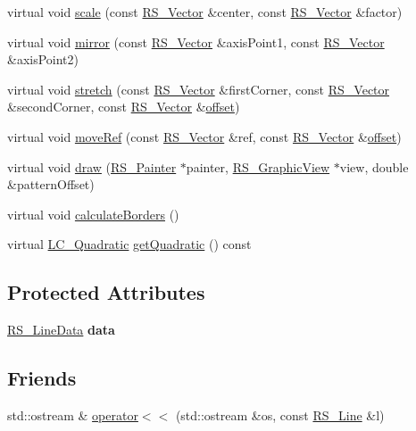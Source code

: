 \begin{DoxyCompactItemize}
\item 
virtual void \hyperlink{classRS__Line_a2fc7cd6bf204c4bc774c1c9f0886aee3}{scale} (const \hyperlink{classRS__Vector}{R\-S\-\_\-\-Vector} \&center, const \hyperlink{classRS__Vector}{R\-S\-\_\-\-Vector} \&factor)
\item 
virtual void \hyperlink{classRS__Line_a81c3d1c89f6ecd8f1e577bdd1b239506}{mirror} (const \hyperlink{classRS__Vector}{R\-S\-\_\-\-Vector} \&axis\-Point1, const \hyperlink{classRS__Vector}{R\-S\-\_\-\-Vector} \&axis\-Point2)
\item 
virtual void \hyperlink{classRS__Line_a2c1e331e16b7264b3e8a34cae9cc52b4}{stretch} (const \hyperlink{classRS__Vector}{R\-S\-\_\-\-Vector} \&first\-Corner, const \hyperlink{classRS__Vector}{R\-S\-\_\-\-Vector} \&second\-Corner, const \hyperlink{classRS__Vector}{R\-S\-\_\-\-Vector} \&\hyperlink{classRS__Line_a159f62094d2f2cbcbe56b38c60e8b96f}{offset})
\item 
virtual void \hyperlink{classRS__Line_adcf436378e89d52b6029409b464ebccb}{move\-Ref} (const \hyperlink{classRS__Vector}{R\-S\-\_\-\-Vector} \&ref, const \hyperlink{classRS__Vector}{R\-S\-\_\-\-Vector} \&\hyperlink{classRS__Line_a159f62094d2f2cbcbe56b38c60e8b96f}{offset})
\item 
virtual void \hyperlink{classRS__Line_abbf35036555e09aa10ac2606aafab1b6}{draw} (\hyperlink{classRS__Painter}{R\-S\-\_\-\-Painter} $\ast$painter, \hyperlink{classRS__GraphicView}{R\-S\-\_\-\-Graphic\-View} $\ast$view, double \&pattern\-Offset)
\item 
virtual void \hyperlink{classRS__Line_afdec6ba966dee60b72e473b93086ae68}{calculate\-Borders} ()
\item 
virtual \hyperlink{classLC__Quadratic}{L\-C\-\_\-\-Quadratic} \hyperlink{classRS__Line_a91ea3f1b51dc9e692e3fe17cb2d81452}{get\-Quadratic} () const 
\end{DoxyCompactItemize}
\subsection*{Protected Attributes}
\begin{DoxyCompactItemize}
\item 
\hypertarget{classRS__Line_af440b1aa3175d3081d35ad68a4d36480}{\hyperlink{classRS__LineData}{R\-S\-\_\-\-Line\-Data} {\bfseries data}}\label{classRS__Line_af440b1aa3175d3081d35ad68a4d36480}

\end{DoxyCompactItemize}
\subsection*{Friends}
\begin{DoxyCompactItemize}
\item 
std\-::ostream \& \hyperlink{classRS__Line_a869d4b2c970866846449c81d34a8f495}{operator$<$$<$} (std\-::ostream \&os, const \hyperlink{classRS__Line}{R\-S\-\_\-\-Line} \&l)
\end{DoxyCompactItemize}


